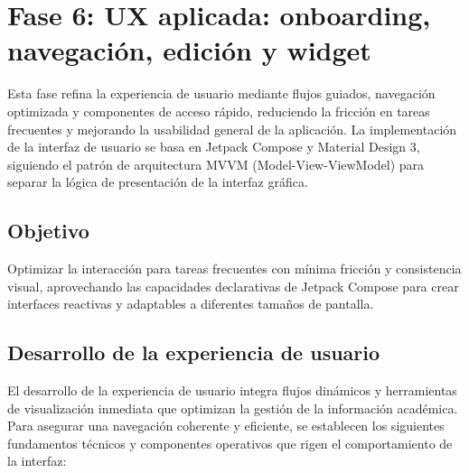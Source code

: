 \section{Fase 6: UX aplicada: onboarding, navegación, edición y widget}

Esta fase refina la experiencia de usuario mediante flujos guiados, navegación optimizada y componentes de acceso rápido, reduciendo la fricción en tareas frecuentes y mejorando la usabilidad general de la aplicación. La implementación de la interfaz de usuario se basa en Jetpack Compose y Material Design 3, siguiendo el patrón de arquitectura MVVM (Model-View-ViewModel) para separar la lógica de presentación de la interfaz gráfica.

\subsection{Objetivo}
Optimizar la interacción para tareas frecuentes con mínima fricción y consistencia visual, aprovechando las capacidades declarativas de Jetpack Compose para crear interfaces reactivas y adaptables a diferentes tamaños de pantalla.

\subsection{Desarrollo de la experiencia de usuario}
El desarrollo de la experiencia de usuario integra flujos dinámicos y herramientas de visualización inmediata que optimizan la gestión de la información académica. Para asegurar una navegación coherente y eficiente, se establecen los siguientes fundamentos técnicos y componentes operativos que rigen el comportamiento de la interfaz:

